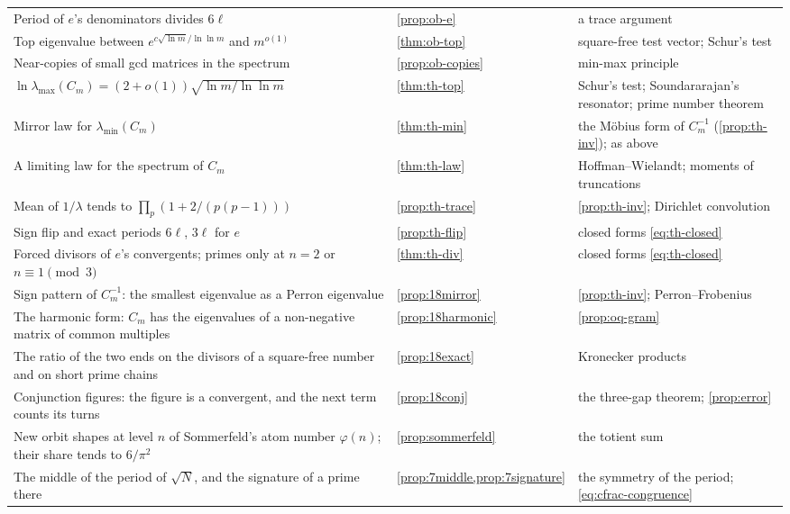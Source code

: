 {\begin{longtable}{@{}>{\raggedright\arraybackslash}p{}>{\raggedright\arraybackslash}p{}>{\raggedright\arraybackslash}p{}@{}}
Period of $e$'s denominators divides $6\ell$ & \cref{prop:ob-e} & a trace argument \\
Top eigenvalue between $e^{c\sqrt{\ln m}/\ln\ln m}$ and $m^{o(1)}$ & \cref{thm:ob-top} & square-free test vector; Schur's test \\
Near-copies of small gcd matrices in the spectrum & \cref{prop:ob-copies} & min-max principle \\
$\ln\lambda_{\max}(C_m) = (2 + o(1))\sqrt{\ln m/\ln\ln m}$ & \cref{thm:th-top} & Schur's test; Soundararajan's resonator; prime number theorem \\
Mirror law for $\lambda_{\min}(C_m)$ & \cref{thm:th-min} & the Möbius form of $C_m^{-1}$ (\cref{prop:th-inv}); as above \\
A limiting law for the spectrum of $C_m$ & \cref{thm:th-law} & Hoffman--Wielandt; moments of truncations \\
Mean of $1/\lambda$ tends to $\prod_p(1 + 2/(p(p-1)))$ & \cref{prop:th-trace} & \cref{prop:th-inv}; Dirichlet convolution \\
Sign flip and exact periods $6\ell$, $3\ell$ for $e$ & \cref{prop:th-flip} & closed forms \eqref{eq:th-closed} \citep{Cohn2006} \\
Forced divisors of $e$'s convergents; primes only at $n = 2$ or $n \equiv 1 \pmod 3$ & \cref{thm:th-div} & closed forms \eqref{eq:th-closed} \\
Sign pattern of $C_m^{-1}$: the smallest eigenvalue as a Perron eigenvalue \addedon{\revD} & \cref{prop:18mirror} & \cref{prop:th-inv}; Perron--Frobenius \\
The harmonic form: $C_m$ has the eigenvalues of a non-negative matrix of common multiples \addedon{\revD} & \cref{prop:18harmonic} & \cref{prop:oq-gram} \\
The ratio of the two ends on the divisors of a square-free number and on short prime chains \addedon{\revD} & \cref{prop:18exact} & Kronecker products \\
Conjunction figures: the figure is a convergent, and the next term counts its turns \addedon{\revD} & \cref{prop:18conj} & the three-gap theorem; \cref{prop:error} \\
New orbit shapes at level $n$ of Sommerfeld's atom number $\varphi(n)$; their share tends to $6/\pi^2$ \addedon{\revE} & \cref{prop:sommerfeld} & the totient sum \\
The middle of the period of $\sqrt N$, and the signature of a prime there \addedon{\revG} & \cref{prop:7middle,prop:7signature} & the symmetry of the period; \eqref{eq:cfrac-congruence} \\

\end{longtable}}
